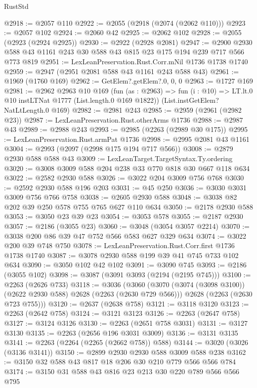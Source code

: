 \begin{lexlean}{RustStd}
\begin{coremodule}
@2918 := @2057 @110
@2922 := @2055 (@2918 (@2074 (@2062 @110)))
@2923 := @2057 @102
@2924 := @2060 @42
@2925 := @2062 @102
@2928 := @2055 (@2923 (@2924 @2925))
@2930 := @2922 (@2928 @2081)
@2947 := @2900 @2930 @588 @43 @1161 @243 @30 @588 @43 @815 @23 @175 @194 @239 @717 @566 @773 @819
@2951 := LexLeanPreservation.Rust.Corr.mNil @1736 @1738 @1740
@2959 := @2947 (@2951 @2081 @588 @43 @1161 @243 @588 @43)
@2961 := @1969 (@1760 @169)
@2962 := GetElem?.getElem?.{0, 0, 0}
@2963 := @1727 @169
@2981 := @2962
    @2963
    @10
    @169
    (fun (as : @2963) =>
    fun (i : @10) => LT.lt.{0} @10 instLTNat @1777 (List.length.{0} @169 @1822))
    (List.instGetElem?NatLtLength.{0} @169)
@2982 := @2981 @243
@2985 := @2959 (@2961 (@2982 @23))
@2987 := LexLeanPreservation.Rust.otherArms @1736
@2988 := @2987 @43
@2989 := @2988 @243
@2993 := @2985 (@2263 (@2989 @30 @175))
@2995 := LexLeanPreservation.Rust.armPat @1736
@2998 := @2995 @2081 @43 @1161
@3004 := @2993 (@2097 (@2998 @175 @194 @717 @566))
@3008 := @2879 @2930 @588 @588 @43
@3009 := LexLeanTarget.TargetSyntax.Ty.ordering
@3020 := @3008 @3009 @588 @204 @238 @33 @770 @818 @30 @667 @118 @634
@3022 := @2582 @2930 @588
@3026 := @3022 @204 @3009 @756 @768
@3030 := @2592 @2930 @588 @196 @203
@3031 := @45 @250
@3036 := @3030 @3031 @3009 @756 @766 @758
@3038 := @2605 @2930 @588
@3048 := @3038 @82 @202 @39 @250 @578 @755 @765 @627 @110 @634
@3050 := @2178 @2930 @588
@3053 := @3050 @23 @39 @23
@3054 := @3053 @578
@3055 := @2187 @2930
@3057 := @2186 (@3055 @23)
@3060 := @3048 (@3054 @3057 @2214)
@3070 := @3038 @200 @86 @39 @47 @752 @566 @583 @627 @329 @634
@3074 := @3022 @200 @39 @748 @750
@3078 := LexLeanPreservation.Rust.Corr.first @1736 @1738 @1740
@3087 := @3078 @2930 @588 @199 @39 @41 @745 @733 @102 @634
@3090 := @3050 @102 @42 @102
@3091 := @3090 @745
@3093 := @2186 (@3055 @102)
@3098 := @3087 (@3091 @3093 (@2194 (@2195 @745)))
@3100 := @2263 (@2626 @733)
@3118 := @3036
    (@3060
      (@3070 (@3074 (@3098 @3100)) (@2622 @2930 @588) @2628 (@2263 (@2630 @729 @566)))
      @2628
      (@2263 (@2630 @723 @755)))
@3120 := @2637 (@2638 @758)
@3121 := @3118 @3120
@3123 := @2263 (@2642 @758)
@3124 := @3121 @3123
@3126 := @2263 (@2647 @758)
@3127 := @3124 @3126
@3130 := @2263 (@2651 @758 @3031)
@3131 := @3127 @3130
@3135 := @2263 (@2656 @196 @3031 @3009)
@3136 := @3131 @3135
@3141 := @2263 (@2264 (@2265 (@2662 @758)) @588)
@3144 := @3020 (@3026 (@3136 @3141))
@3150 := @2899 @2930 @2930 @588 @3009 @588 @238
@3162 := @3150 @32 @588 @43 @817 @18 @206 @30 @210 @779 @566 @566 @784
@3174 := @3150 @31 @588 @43 @816 @23 @213 @30 @220 @789 @566 @566 @795

\end{coremodule}
\end{lexlean}
